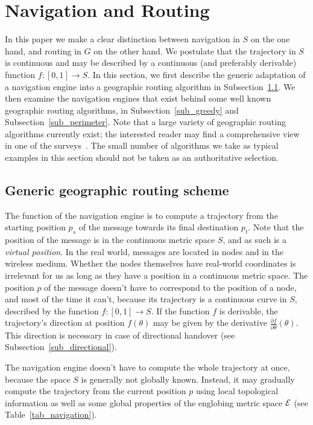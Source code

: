 \documentclass{article}
\newcommand{\englobing}{{\cal E}}
\begin{document}
\section{Navigation and Routing}
\label{sec_navigation}
In this paper we make a clear distinction between navigation in $S$ on the one hand, and routing in $G$ on the other hand. We postulate that the trajectory in $S$ is continuous and may be described by a continuous (and preferably derivable) function $f:[0,1]\rightarrow S$.
In this section, we first describe the generic adaptation of a navigation engine into a geographic routing algorithm in Subsection~\ref{sub_scheme}. We then examine the navigation engines that exist behind some well known geographic routing algorithms, in Subsection~\ref{sub_greedy} and Subsection~\ref{sub_perimeter}.
Note that a large variety of geographic routing algorithms currently exist; the interested reader may find a comprehensive view in one of the surveys~\cite{bib_survey1,bib_survey2}. The small number of algorithms we take as typical examples in this section should not be taken as an authoritative selection.

\subsection{Generic geographic routing scheme}
\label{sub_scheme}
The function of the navigation engine is to compute a trajectory from the starting position $p_s$ of the message towards its final destination $p_t$. Note that the position of the message is in the continuous metric space $S$, and as such is a {\em virtual position}. In the real world, messages are located in nodes and in the wireless medium. Whether the nodes themselves have real-world coordinates is irrelevant for us as long as they have a position in a continuous metric space. The position $p$ of the message doesn't have to correspond to the position of a node, and most of the time it can't, because its trajectory is a continuous curve in $S$, described by the function $f:[0,1]\rightarrow S$. If the function $f$ is derivable, the trajectory's direction at position $f(\theta)$ may be given by the derivative $\frac{\partial f}{\partial\theta}(\theta)$. This direction is necessary in case of directional handover (see Subsection~\ref{sub_directional}).

The navigation engine doesn't have to compute the whole trajectory at once, because the space $S$ is generally not globally known. Instead, it may gradually compute the trajectory from the current position $p$ using local topological information as well as some global properties of the englobing metric space $\englobing$ (see Table~\ref{tab_navigation}).
\end{document}
